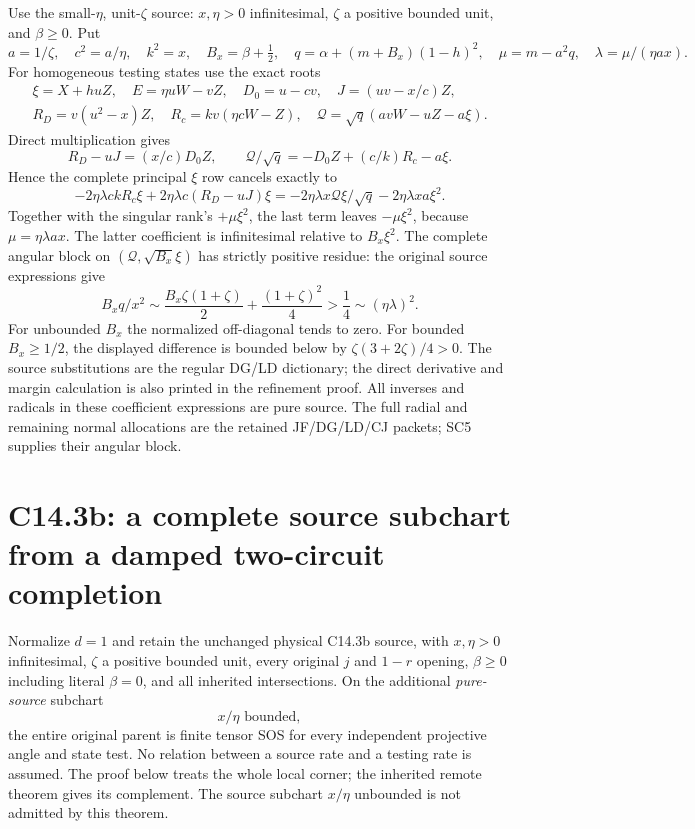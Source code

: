 Use the small-$\eta$, unit-$\zeta$ source: $x,\eta>0$
infinitesimal, $\zeta$ a positive bounded unit, and
$\beta\ge0$.  Put
\[
 a=1/\zeta,\quad c^2=a/\eta,\quad k^2=x,\quad
 B_x=\beta+\tfrac12,\quad q=\alpha+(m+B_x)(1-h)^2,
 \quad\mu=m-a^2q,\quad\lambda=\mu/(\eta ax).
\]
For homogeneous testing states use the exact roots
\[
\begin{gathered}
 \xi=X+huZ,\quad E=\eta uW-vZ,\quad
 D_0=u-cv,\quad J=(uv-x/c)Z,\\
 R_D=v(u^2-x)Z,\quad R_c=kv(\eta cW-Z),\quad
 \mathcal Q=\sqrt q(avW-uZ-a\xi).
\end{gathered}
\]
Direct multiplication gives
\[
 R_D-uJ=(x/c)D_0Z,\qquad
 \mathcal Q/\sqrt q=-D_0Z+(c/k)R_c-a\xi.
\]
Hence the complete principal $\xi$ row cancels exactly to
\[
 -2\eta\lambda ckR_c\xi+2\eta\lambda c(R_D-uJ)\xi
 =-2\eta\lambda x\mathcal Q\xi/\sqrt q
                    -2\eta\lambda xa\xi^2.             \tag{SC5}
\]
Together with the singular rank's $+\mu\xi^2$, the last term
leaves $-\mu\xi^2$, because $\mu=\eta\lambda ax$.
The latter coefficient is infinitesimal relative to $B_x\xi^2$.
The complete angular block on $(\mathcal Q,\sqrt{B_x}\xi)$
has strictly positive residue: the original source expressions give
\[
 B_xq/x^2\sim
 \frac{B_x\zeta(1+\zeta)}2+\frac{(1+\zeta)^2}4
       >\frac14\sim(\eta\lambda)^2.
\]
For unbounded $B_x$ the normalized off-diagonal tends to zero.
For bounded $B_x\ge1/2$, the displayed difference is bounded
below by $\zeta(3+2\zeta)/4>0$.  The source substitutions are
the regular DG/LD dictionary; the direct derivative and margin
calculation is also printed in the refinement proof.
All inverses and radicals in these coefficient expressions are
pure source.  The full radial and remaining normal allocations are
the retained JF/DG/LD/CJ packets; SC5 supplies their angular block.


\section{\texorpdfstring{C14.3b: a complete source subchart from a damped two-circuit completion}{C14.3b: a complete source subchart from a damped two-circuit completion}}
\label{component:p024c821bfb59}


\begin{theorem}
Normalize $d=1$ and retain the unchanged physical C14.3b source, with $x,\eta>0$
infinitesimal, $\zeta$ a positive bounded unit, every original $j$
and $1-r$ opening, $\beta\ge0$ including literal $\beta=0$, and all inherited intersections.
On the additional \emph{pure-source} subchart
\[
                         x/\eta\text{ bounded},              \tag{DG1}
\]
the entire original parent is finite tensor SOS for every independent
projective angle and state test. No relation between a source rate
and a testing rate is assumed. The proof below treats the whole local
corner; the inherited remote theorem gives its complement. The source
subchart $x/\eta$ unbounded is not admitted by this theorem.
\end{theorem}

